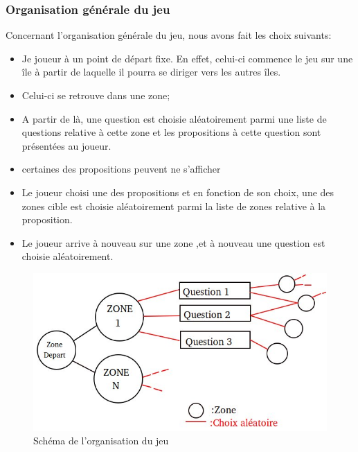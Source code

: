
\subsubsection{Organisation générale du jeu}

Concernant l'organisation générale du jeu, nous avons fait les choix suivants:
\begin{itemize}
	\item Je joueur à un point de départ fixe. En effet, celui-ci commence le jeu sur une île à partir de laquelle il pourra se diriger vers les autres îles.
	\item Celui-ci se retrouve dans une zone;
	\item A partir de là, une question est choisie aléatoirement parmi une liste de questions relative à cette zone et les propositions à cette question sont présentées au joueur.
	\item certaines des propositions peuvent ne s'afficher 
	\item Le joueur choisi une des propositions et en fonction de son choix, une des zones cible est choisie aléatoirement parmi la liste de zones relative à la proposition.
	\item Le joueur arrive à nouveau sur une zone ,et à nouveau une question est choisie aléatoirement.   
\end{itemize}
\begin{figure}[h]
	\includegraphics[scale=0.7]{figures/schema-organisation.jpg}
	\caption{Schéma de l'organisation du jeu }
\end{figure}